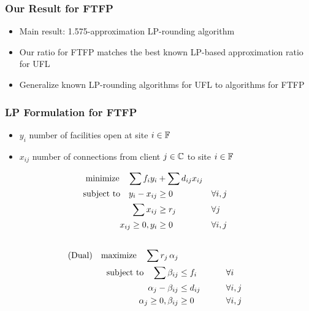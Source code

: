 \documentclass[handout, hyperref, dvipsnames]{beamer}
\begin{document}
\begin{frame}
  \frametitle{Our Result for FTFP}

  \begin{itemize}
  \item Main result: 1.575-approximation LP-rounding algorithm
  \item Our ratio for FTFP matches the best known LP-based
    approximation ratio for UFL
  \item Generalize known LP-rounding algorithms for UFL to algorithms for FTFP
  \end{itemize}
\end{frame}


\begin{frame}
  \frametitle{LP Formulation for FTFP}
  \begin{itemize}
  \item $y_i$   number of facilities open at site $i\in \mathbb{F}$
  \item $x_{ij}$ number of connections from client $j\in
    \mathbb{C}$ to site $i \in \mathbb{F}$
  \end{itemize}
  \begin{alignat}{3}
    \textrm{minimize}\quad \sum f_iy_i &+ \sum d_{ij}x_{ij}&
    \\ \notag
    \textrm{subject to}\quad y_i - x_{ij} &\geq 0  & &\forall i,j
    \\ \notag
    \sum x_{ij} &\geq r_j & &\forall j
    \\ \notag
    x_{ij} \geq 0, y_i &\geq 0 & &\forall i,j
    \\ \notag
  \end{alignat}
  \begin{alignat}{3}
  \text{(Dual)}\quad  \textrm{maximize}\quad \sum r_j\, \alpha_j&
    \\ \notag
    \textrm{subject to} \quad 
      \sum \beta_{ij} &\leq f_i  &\quad\quad			&\forall i
    \\ \notag
    \alpha_{j} - \beta_{ij} 	&\leq  d_{ij}       &                 & \forall i,j
    \\ \notag
    \alpha_j \geq 0, \beta_{ij} &\geq 0           &            & \forall i,j
  \end{alignat}
\end{frame}
\end{document}

